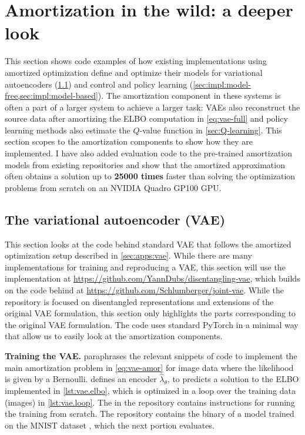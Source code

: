 \section{Amortization in the wild: a deeper look}
\label{sec:impl:eval}

This section shows code examples of how existing implementations
using amortized optimization define and optimize their models
for variational autoencoders (\cref{sec:impl:vaes})
and control and policy learning (\cref{sec:impl:model-free,sec:impl:model-based}).
The amortization component in these systems is often a part
of a larger system to achieve a larger task:
VAEs also reconstruct the source data
after amortizing the ELBO computation in \cref{eq:vae-full}
and policy learning methods also estimate the
$Q$-value function in \cref{sec:Q-learning}.
This section scopes to the amortization components to show
how they are implemented.
I have also added evaluation code to the pre-trained amortization models
from existing repositories and show that the amortized approximation
often obtains a solution up to \textbf{25000 times} faster than
solving the optimization problems from scratch on an
NVIDIA Quadro GP100 GPU.

\subsection{The variational autoencoder (VAE)}
\label{sec:impl:vaes}

This section looks at the code behind
standard VAE \citep{kingma2013auto} that follows the
amortized optimization setup described in \cref{sec:apps:vae}.
While there are many implementations for training and
reproducing a VAE, this section will use the implementation at
\url{https://github.com/YannDubs/disentangling-vae},
which builds on the code behind
\citet{dupont2018learning} at
\url{https://github.com/Schlumberger/joint-vae}.
While the repository is focused on disentangled representations
and extensions of the original VAE formulation, this
section only highlights the parts corresponding to the
original VAE formulation.
The code uses standard PyTorch in a minimal way that
allow us to easily look at the amortization components.

\textbf{Training the VAE.}
 paraphrases the relevant snippets of code to
implement the main amortization problem in \cref{eq:vae-amor}
for image data where the likelihood is given by a Bernoulli.
 defines an encoder $\hat \lambda_\theta$,
to predicts a solution to the ELBO implemented in \cref{lst:vae.elbo},
which is optimized in a loop over the training data (images)
in \cref{lst:vae.loop}.
The  in the repository contains instructions
for running the training from scratch.
The repository contains the binary of a model trained
on the MNIST dataset \citep{lecun1998mnist}, which
the next portion evaluates.

